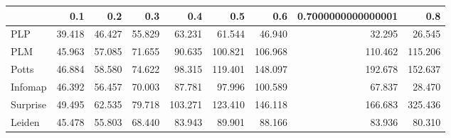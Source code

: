 \begin{tabular}{lrrrrrrrr}
\toprule
{} &    0.1 &    0.2 &    0.3 &     0.4 &     0.5 &     0.6 & 0.7000000000000001 &     0.8 \\
\midrule
PLP      & 39.418 & 46.427 & 55.829 &  63.231 &  61.544 &  46.940 &             32.295 &  26.545 \\
PLM      & 45.963 & 57.085 & 71.655 &  90.635 & 100.821 & 106.968 &            110.462 & 115.206 \\
Potts    & 46.884 & 58.580 & 74.622 &  98.315 & 119.401 & 148.097 &            192.678 & 152.637 \\
Infomap  & 46.392 & 56.457 & 70.003 &  87.781 &  97.996 & 100.589 &             67.837 &  28.470 \\
Surprise & 49.495 & 62.535 & 79.718 & 103.271 & 123.410 & 146.118 &            166.683 & 325.436 \\
Leiden   & 45.478 & 55.803 & 68.440 &  83.943 &  89.901 &  88.166 &             83.936 &  80.310 \\
\bottomrule
\end{tabular}
